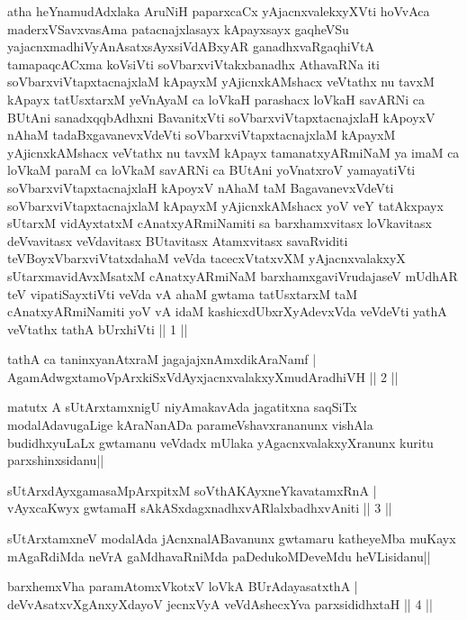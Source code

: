 \begin{shl}
atha heYnamudAdxlaka AruNiH paparxcaCx yAjacnxvalekxyXVti hoVvAca maderxVSavxvasAma patacnajxlasayx kApayxsayx gaqheVSu yajacnxmadhiVyAnAsatxsAyxsiVdABxyAR ganadhxvaRgaqhiVtA tamapaqcACxma koV\s siVti soV\s barxviVtakxbanadhx AthavaRNa iti soV\s barxviVtapxtacnajxlaM kApayxM yAjicnxkAMshacx veVtathx nu tavxM kApayx tatUsxtarxM yeVnAyaM ca loVkaH parashacx loVkaH savARNi ca BUtAni sanadxqqbAdhxni BavanitxVti soV\s barxviVtapxtacnajxlaH kApoyxV nAhaM tadaBxgavanevxVdeVti soV\s barxviVtapxtacnajxlaM kApayxM yAjicnxkAMshacx veVtathx nu tavxM kApayx tamanatxyARmiNaM ya imaM ca loVkaM paraM ca loVkaM savARNi ca BUtAni yoV\s natxroV yamayatiVti soV\s barxviVtapxtacnajxlaH kApoyxV nAhaM taM BagavanevxVdeVti soV\s barxviVtapxtacnajxlaM kApayxM yAjicnxkAMshacx yoV veY tatAkxpayx sUtarxM vidAyxtatxM cAnatxyARmiNamiti sa barxhamxvitasx loVkavitasx deVvavitasx veVdavitasx BUtavitasx Atamxvitasx savaRviditi teVBoyxV\s barxviVtatxdahaM veVda tacecxVtatxvXM yAjacnxvalakxyX sUtarxmavidAvxMsatxM cAnatxyARmiNaM barxhamxgaviVrudajaseV mUdhAR teV vipatiSayxtiVti veVda vA ahaM gwtama tatUsxtarxM taM cAnatxyARmiNamiti yoV vA idaM kashicxdUbxrXyAdevxVda veVdeVti yathA veVtathx tathA bUrxhiVti || 1 ||
\end{shl}

\begin{shl}
tathA ca taninxyanAtxraM jagajajxnAmxdikAraNamf |\\
AgamAdwgxtamoV\s pArxkiSxVdAyxjacnxvalakxyXmudAradhiVH \hfill || 2 ||
\end{shl}

\begin{artha}
matutx A sUtArxtamxnigU niyAmakavAda jagatitxna saqSiTx modalAdavugaLige kAraNanADa parameVshavxrananunx vishAla budidhxyuLaLx gwtamanu veVdadx mUlaka yAgacnxvalakxyXranunx kuritu parxshinxsidanu||
\end{artha}

\begin{shl}
sUtArxdAyxgamasaMpArxpitxM soV\s thA\s \s KAyxneYkavatamxRnA |\\
vAyxcaKwyx gwtamaH sAkASxdagxnadhxvARlalxbadhxvAniti \hfill || 3 ||
\end{shl}

\begin{artha}
sUtArxtamxneV modalAda jAcnxnalABavanunx gwtamaru katheyeMba muKayx mAgaRdiMda neVrA gaMdhavaRniMda paDedukoMDeveMdu heVLisidanu||
\end{artha}

\begin{shl}
barxhemxVha paramAtomxVkotxV loVkA BUrAdayasatxthA |\\
deVvAsatxvXgAnxyXdayoV jecnxVyA veVdAshecxYva parxsididhxtaH \hfill || 4 ||
\end{shl}

